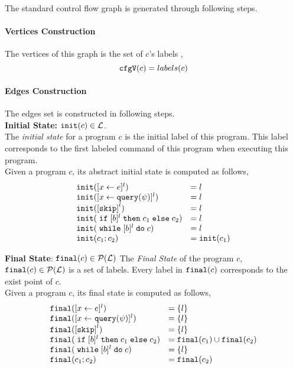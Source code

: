 The standard control flow graph is generated through following steps.
\paragraph*{Vertices Construction}
The vertices of this graph is the set of $c$'s labels , 
\[ 
  {\mathtt{cfgV}}(c) = labels(c)
\]
%
\paragraph*{Edges Construction}
The edges set is constructed in following steps.
\\
\textbf{Initial State:}
%
${\mathtt{init}}(c) \in \mathcal{L}$.
\\
The \emph{initial state} for a program $c$ is the initial label of this program.
This label corresponds to the first labeled command of this program 
when executing this program.
\\
Given a program $c$, its abstract initial state is computed as follows,
%
\[
  \begin{array}{ll}
    \cfginit(\clabel{\assign{x}{\expr}}{}^l)  & = l  \\
    \cfginit(\clabel{\assign{x}{\query(\qexpr)}}{}^l)  & = l \\
    \cfginit(\clabel{\eskip}^{l})  & = l \\
    \cfginit(\eif [b]^l \ethen c_1 \eelse c_2)  & = l \\
    \cfginit(\ewhile [b]^l \edo c)  & = l \\
    \cfginit(c_1 ; c_2)  & = \cfginit(c_1) \\
 \end{array}
 \]
%

\textbf{Final State}: ${\mathtt{final}}(c) \in \mathcal{P}(\mathcal{L})$
The \emph{Final State} of the program $c$, 
${\mathtt{final}}(c) \in \mathcal{P}(\mathcal{L})$
is a set of labels.
Every label in ${\mathtt{final}}(c)$ corresponds to the exist point of $c$.
\\
Given a program $c$, its final state is computed as follows,
 \[
  \begin{array}{ll}
    \cfgfinal(\clabel{\assign{x}{\expr}}{}^l)  & = \{l\}  \\
     \cfgfinal(\clabel{\assign{x}{\query(\qexpr)}}{}^l)  & = \{l\}  \\
     \cfgfinal(\clabel{\eskip}^{l})  & = \{l\} \\
     \cfgfinal(\eif [b]^l \ethen c_1 \eelse c_2)  & = \cfgfinal(c_1) \cup \cfgfinal(c_2) \\
     \cfgfinal(\ewhile [b]^l \edo c)  & = \{l\} \\
     \cfgfinal(c_1 ; c_2)  & =  \cfgfinal(c_2) 
 \end{array}
 \]

